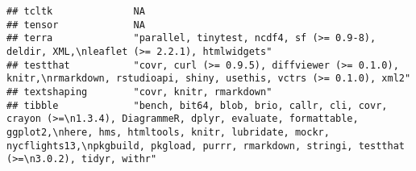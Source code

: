 \documentclass[
]{article}
\begin{document}
\begin{verbatim}
## tcltk              NA                                                                                                                                                                                                                                                                                                                                                                                                                                                                                
## tensor             NA                                                                                                                                                                                                                                                                                                                                                                                                                                                                                
## terra              "parallel, tinytest, ncdf4, sf (>= 0.9-8), deldir, XML,\nleaflet (>= 2.2.1), htmlwidgets"                                                                                                                                                                                                                                                                                                                                                                                         
## testthat           "covr, curl (>= 0.9.5), diffviewer (>= 0.1.0), knitr,\nrmarkdown, rstudioapi, shiny, usethis, vctrs (>= 0.1.0), xml2"                                                                                                                                                                                                                                                                                                                                                             
## textshaping        "covr, knitr, rmarkdown"                                                                                                                                                                                                                                                                                                                                                                                                                                                          
## tibble             "bench, bit64, blob, brio, callr, cli, covr, crayon (>=\n1.3.4), DiagrammeR, dplyr, evaluate, formattable, ggplot2,\nhere, hms, htmltools, knitr, lubridate, mockr, nycflights13,\npkgbuild, pkgload, purrr, rmarkdown, stringi, testthat (>=\n3.0.2), tidyr, withr"                                                                                                                                                                                                              

\end{verbatim}
\end{document}
